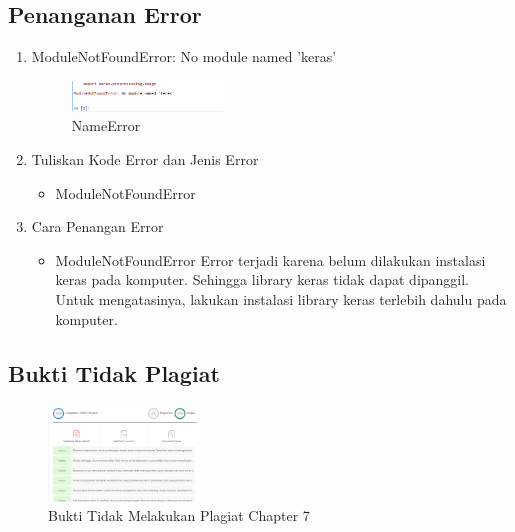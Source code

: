 \subsection{Penanganan Error}
\begin{enumerate}
	\item ModuleNotFoundError: No module named 'keras'
	\begin{figure}[H]
		\includegraphics[width=4cm]{figures/1174077/7/error.PNG}
		\centering
		\caption{NameError}
	\end{figure}
	\item Tuliskan Kode Error dan Jenis Error
	\begin{itemize}
		\item ModuleNotFoundError
	\end{itemize}
	\item Cara Penangan Error
	\begin{itemize}
		\item ModuleNotFoundError
		\hfill\break
		Error terjadi karena belum dilakukan instalasi keras pada komputer. Sehingga library keras tidak dapat dipanggil. Untuk mengatasinya, lakukan instalasi library keras terlebih dahulu pada komputer.
	\end{itemize}
\end{enumerate}

\subsection{Bukti Tidak Plagiat}
\begin{figure}[H]
\centering
	\includegraphics[width=4cm]{figures/1174077/7/plagiarisme.PNG}
	\caption{Bukti Tidak Melakukan Plagiat Chapter 7}
\end{figure}


